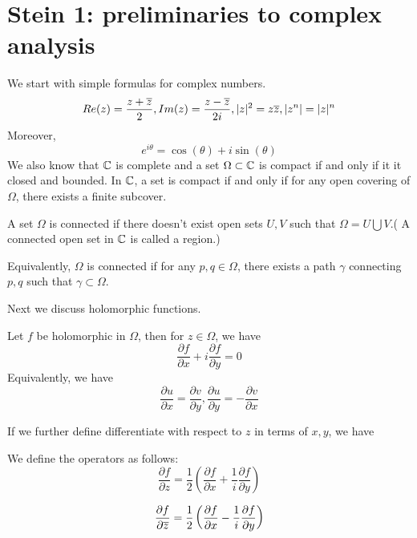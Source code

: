\chapter{Stein 1: preliminaries to complex analysis}

We start with simple formulas for complex numbers.
\begin{equation*}
    Re(z)=\frac{z+\overline{z}}{2}, Im(z)=\frac{z-\overline{z}}{2i}, |z|^2=z\overline{z}, |z^n|=|z|^n
\end{equation*}
Moreover,
\begin{equation*}
    e^{i\theta}=\cos(\theta)+i\sin(\theta)
\end{equation*}
We also know that $\mathbb{C}$ is complete and a set $\Omega\subset\mathbb{C}$ is compact if and only if it it closed and bounded. In $\mathbb{C}$, a set is compact if and only if for any open covering of $\Omega$, there exists a finite subcover.
\begin{defn}[connected]
    A set $\Omega$ is connected if there doesn't exist open sets $U,V$ such that $\Omega=U\bigcup V$.( A connected open set in $\mathbb{C}$ is called a region.)

    Equivalently, $\Omega$ is connected if for any $p,q\in\Omega$, there exists a path $\gamma$ connecting $p,q$ such that $\gamma\subset\Omega$.
\end{defn}
Next we discuss holomorphic functions.
\begin{prop}
    Let $f$ be holomorphic in $\Omega$, then for $z\in\Omega$, we have 
    \begin{equation*}
        \frac{\partial f}{\partial x}+i\frac{\partial f}{\partial y}=0
    \end{equation*}
    Equivalently, we have 
    \begin{equation*}
        \frac{\partial u}{\partial x}=\frac{\partial v}{\partial y}, \frac{\partial u}{\partial y}=-\frac{\partial v}{\partial x}
    \end{equation*}
\end{prop}
If we further define differentiate with respect to $z$ in terms of $x,y$, we have 
\begin{defn}
    We define the operators as follows:
    \begin{equation*}
            \frac{\partial f}{\partial z}=\frac{1}{2}\left(\frac{\partial f}{\partial x}+\frac{1}{i}\frac{\partial f}{\partial y}\right)
    \end{equation*}

    \begin{equation*}
        \frac{\partial f}{\partial\overline{z}}=\frac{1}{2}\left(\frac{\partial f}{\partial x}-\frac{1}{i}\frac{\partial f}{\partial y}\right)
    \end{equation*}
\end{defn}
